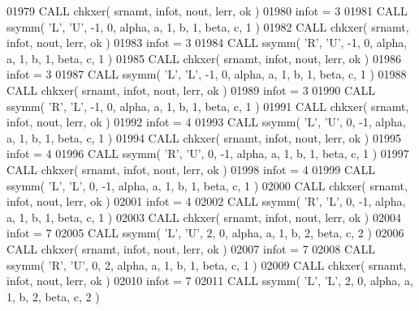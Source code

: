 \begin{DoxyCode}
01979       \textcolor{keyword}{CALL }chkxer( srnamt, infot, nout, lerr, ok )
01980       infot = 3
01981       \textcolor{keyword}{CALL }ssymm( \textcolor{stringliteral}{'L'}, \textcolor{stringliteral}{'U'}, -1, 0, alpha, a, 1, b, 1, beta, c, 1 )
01982       \textcolor{keyword}{CALL }chkxer( srnamt, infot, nout, lerr, ok )
01983       infot = 3
01984       \textcolor{keyword}{CALL }ssymm( \textcolor{stringliteral}{'R'}, \textcolor{stringliteral}{'U'}, -1, 0, alpha, a, 1, b, 1, beta, c, 1 )
01985       \textcolor{keyword}{CALL }chkxer( srnamt, infot, nout, lerr, ok )
01986       infot = 3
01987       \textcolor{keyword}{CALL }ssymm( \textcolor{stringliteral}{'L'}, \textcolor{stringliteral}{'L'}, -1, 0, alpha, a, 1, b, 1, beta, c, 1 )
01988       \textcolor{keyword}{CALL }chkxer( srnamt, infot, nout, lerr, ok )
01989       infot = 3
01990       \textcolor{keyword}{CALL }ssymm( \textcolor{stringliteral}{'R'}, \textcolor{stringliteral}{'L'}, -1, 0, alpha, a, 1, b, 1, beta, c, 1 )
01991       \textcolor{keyword}{CALL }chkxer( srnamt, infot, nout, lerr, ok )
01992       infot = 4
01993       \textcolor{keyword}{CALL }ssymm( \textcolor{stringliteral}{'L'}, \textcolor{stringliteral}{'U'}, 0, -1, alpha, a, 1, b, 1, beta, c, 1 )
01994       \textcolor{keyword}{CALL }chkxer( srnamt, infot, nout, lerr, ok )
01995       infot = 4
01996       \textcolor{keyword}{CALL }ssymm( \textcolor{stringliteral}{'R'}, \textcolor{stringliteral}{'U'}, 0, -1, alpha, a, 1, b, 1, beta, c, 1 )
01997       \textcolor{keyword}{CALL }chkxer( srnamt, infot, nout, lerr, ok )
01998       infot = 4
01999       \textcolor{keyword}{CALL }ssymm( \textcolor{stringliteral}{'L'}, \textcolor{stringliteral}{'L'}, 0, -1, alpha, a, 1, b, 1, beta, c, 1 )
02000       \textcolor{keyword}{CALL }chkxer( srnamt, infot, nout, lerr, ok )
02001       infot = 4
02002       \textcolor{keyword}{CALL }ssymm( \textcolor{stringliteral}{'R'}, \textcolor{stringliteral}{'L'}, 0, -1, alpha, a, 1, b, 1, beta, c, 1 )
02003       \textcolor{keyword}{CALL }chkxer( srnamt, infot, nout, lerr, ok )
02004       infot = 7
02005       \textcolor{keyword}{CALL }ssymm( \textcolor{stringliteral}{'L'}, \textcolor{stringliteral}{'U'}, 2, 0, alpha, a, 1, b, 2, beta, c, 2 )
02006       \textcolor{keyword}{CALL }chkxer( srnamt, infot, nout, lerr, ok )
02007       infot = 7
02008       \textcolor{keyword}{CALL }ssymm( \textcolor{stringliteral}{'R'}, \textcolor{stringliteral}{'U'}, 0, 2, alpha, a, 1, b, 1, beta, c, 1 )
02009       \textcolor{keyword}{CALL }chkxer( srnamt, infot, nout, lerr, ok )
02010       infot = 7
02011       \textcolor{keyword}{CALL }ssymm( \textcolor{stringliteral}{'L'}, \textcolor{stringliteral}{'L'}, 2, 0, alpha, a, 1, b, 2, beta, c, 2 )

\end{DoxyCode}
